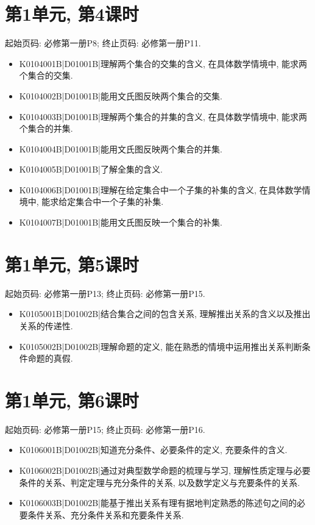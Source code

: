 \section*{第1单元, 第4课时}
起始页码: 必修第一册P8; 终止页码: 必修第一册P11.
\begin{itemize}
\item K0104001B|D01001B|理解两个集合的交集的含义, 在具体数学情境中, 能求两个集合的交集.
\item K0104002B|D01001B|能用文氏图反映两个集合的交集.
\item K0104003B|D01001B|理解两个集合的并集的含义, 在具体数学情境中, 能求两个集合的并集.
\item K0104004B|D01001B|能用文氏图反映两个集合的并集.
\item K0104005B|D01001B|了解全集的含义.
\item K0104006B|D01001B|理解在给定集合中一个子集的补集的含义, 在具体数学情境中, 能求给定集合中一个子集的补集.
\item K0104007B|D01001B|能用文氏图反映一个集合的补集.
\end{itemize}

\section*{第1单元, 第5课时}
起始页码: 必修第一册P13; 终止页码: 必修第一册P15.
\begin{itemize}
\item K0105001B|D01002B|结合集合之间的包含关系, 理解推出关系的含义以及推出关系的传递性.
\item K0105002B|D01002B|理解命题的定义, 能在熟悉的情境中运用推出关系判断条件命题的真假.
\end{itemize}

\section*{第1单元, 第6课时}
起始页码: 必修第一册P15; 终止页码: 必修第一册P16.
\begin{itemize}
\item K0106001B|D01002B|知道充分条件、必要条件的定义, 充要条件的含义.
\item K0106002B|D01002B|通过对典型数学命题的梳理与学习, 理解性质定理与必要条件的关系、判定定理与充分条件的关系, 以及数学定义与充要条件的关系.
\item K0106003B|D01002B|能基于推出关系有理有据地判定熟悉的陈述句之间的必要条件关系、充分条件关系和充要条件关系.
\end{itemize}

